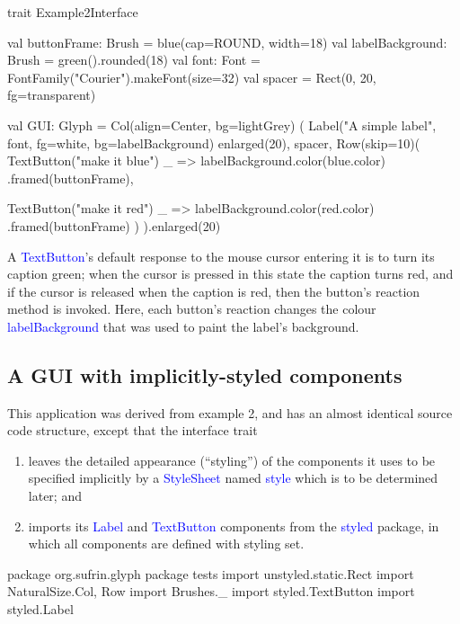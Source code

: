 \documentclass[12pt,a4paper]{article}
\def\Scala#1{\textcolor{blue}{\textsf{#1}}}
\def\SS#1{\subsection{#1}}
\begin{document}
\begin{scala}
trait Example2Interface {
  val buttonFrame: Brush =
        blue(cap=ROUND, width=18)
  val labelBackground: Brush =
        green().rounded(18)
  val font: Font  =
        FontFamily("Courier").makeFont(size=32)
  val spacer =
      Rect(0, 20, fg=transparent)

  val GUI: Glyph = Col(align=Center, bg=lightGrey) (
    Label("A simple label", font,
          fg=white,
          bg=labelBackground) enlarged(20),
    spacer,
    Row(skip=10)(
        TextButton("make it blue")
           { _ => labelBackground.color(blue.color) }
           .framed(buttonFrame),
           
        TextButton("make it red")
           { _ => labelBackground.color(red.color) }
           .framed(buttonFrame)
    )
  ).enlarged(20)
}
\end{scala}

A \Scala{TextButton}'s default response to the mouse cursor entering
it is to turn its caption green; when the cursor is pressed in this
state the caption turns red, and if the cursor is released when the
caption is red, then the button's reaction method is invoked. Here,
each button's reaction changes the colour \Scala{labelBackground} that
was used to paint the label's background.

\begin{center}
\end{center}


\clearpage
\SS{A GUI with implicitly-styled components}

This application was derived from example 2, and has an almost
identical source code structure, except that the interface trait
\begin{enumerate}
\item leaves the detailed appearance (``styling'') of the
      components it uses to be specified implicitly by a
      \Scala{StyleSheet} named \Scala{style}
      which is to be determined later; and
\item imports its \Scala{Label} and \Scala{TextButton}
      components from the \Scala{styled} package, in which
      all components are defined with styling set. 
\end{enumerate}

\begin{scala}
package org.sufrin.glyph
package tests
import unstyled.static.Rect
import NaturalSize.{Col, Row}
import Brushes._
import styled.TextButton
import styled.Label
\end{scala}
\end{document}
